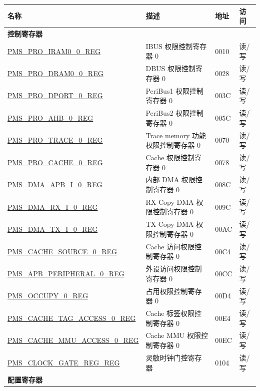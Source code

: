 \begin{longtable}{ |m{6cm} |m{7.2cm} | m{1.3cm} |m{1cm} | }
\hline\rowcolor{lightgray}
名称 & 描述 &  地址 & 访问 \\ \hline
\endhead
\multicolumn{4}{|l|}{\textbf{控制寄存器}} \\ \hline

\hyperref[regdesc:PMSPROIRAM00REG]{PMS\_PRO\_IRAM0\_0\_REG} & IBUS 权限控制寄存器 0 & \hexprefix{}0010 & 读/写 \\ \hline
\hyperref[regdesc:PMSPRODRAM00REG]{PMS\_PRO\_DRAM0\_0\_REG} & DBUS 权限控制寄存器 0 & \hexprefix{}0028 & 读/写 \\ \hline
\hyperref[regdesc:PMSPRODPORT0REG]{PMS\_PRO\_DPORT\_0\_REG} & PeriBus1 权限控制寄存器 0 & \hexprefix{}003C & 读/写 \\ \hline
\hyperref[regdesc:PMSPROAHB0REG]{PMS\_PRO\_AHB\_0\_REG} & PeriBus2 权限控制寄存器 0 & \hexprefix{}005C & 读/写 \\ \hline
\hyperref[regdesc:PMSPROTRACE0REG]{PMS\_PRO\_TRACE\_0\_REG} & Trace memory 功能权限控制寄存器 0 & \hexprefix{}0070 & 读/写 \\ \hline
\hyperref[regdesc:PMSPROCACHE0REG]{PMS\_PRO\_CACHE\_0\_REG} & Cache 权限控制寄存器 0 & \hexprefix{}0078 & 读/写 \\ \hline
\hyperref[regdesc:PMSDMAAPBI0REG]{PMS\_DMA\_APB\_I\_0\_REG} & 内部 DMA 权限控制寄存器 0 & \hexprefix{}008C & 读/写 \\ \hline
\hyperref[regdesc:PMSDMARXI0REG]{PMS\_DMA\_RX\_I\_0\_REG} & RX Copy DMA 权限控制寄存器 0 & \hexprefix{}009C & 读/写 \\ \hline
\hyperref[regdesc:PMSDMATXI0REG]{PMS\_DMA\_TX\_I\_0\_REG} & TX Copy DMA 权限控制寄存器 0 & \hexprefix{}00AC & 读/写 \\ \hline
\hyperref[regdesc:PMSCACHESOURCE0REG]{PMS\_CACHE\_SOURCE\_0\_REG} & Cache 访问权限控制寄存器 0 & \hexprefix{}00C4 & 读/写 \\ \hline
\hyperref[regdesc:PMSAPBPERIPHERAL0REG]{PMS\_APB\_PERIPHERAL\_0\_REG} & 外设访问权限控制寄存器 0 & \hexprefix{}00CC & 读/写 \\ \hline
\hyperref[regdesc:PMSOCCUPY0REG]{PMS\_OCCUPY\_0\_REG} & 占用权限控制寄存器 0 & \hexprefix{}00D4 & 读/写 \\ \hline
\hyperref[regdesc:PMSCACHETAGACCESS0REG]{PMS\_CACHE\_TAG\_ACCESS\_0\_REG} & Cache 标签权限控制寄存器 0 & \hexprefix{}00E4 & 读/写 \\ \hline
\hyperref[regdesc:PMSCACHEMMUACCESS0REG]{PMS\_CACHE\_MMU\_ACCESS\_0\_REG} & Cache MMU 权限控制寄存器 0 & \hexprefix{}00EC & 读/写 \\ \hline
\hyperref[regdesc:PMSCLOCKGATEREGREG]{PMS\_CLOCK\_GATE\_REG\_REG} & 灵敏时钟门控寄存器 & \hexprefix{}0104 & 读/写 \\ \hline
\multicolumn{4}{|l|}{\textbf{配置寄存器}} \\ \hline


\end{longtable}
